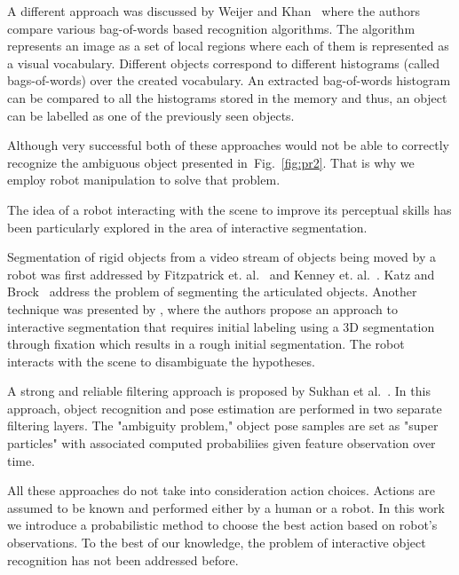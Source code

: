\documentclass[conference]{IEEEtran}
\newcommand{\figref}[1]{Fig.~\ref{#1}}
\begin{document}
    A different approach was discussed by Weijer and Khan~\cite{van2013fusing} where the authors compare various bag-of-words based recognition algorithms. The algorithm represents an image as a set of local regions where each of them is represented as a visual vocabulary. Different objects correspond to different histograms (called bags-of-words) over the created vocabulary. An extracted bag-of-words histogram can be compared to all the histograms stored in the memory and thus, an object can be labelled as one of the previously seen objects.

    Although very successful both of these approaches would not be able to correctly recognize the ambiguous object presented in~\figref{fig:pr2}. That is why we employ robot manipulation to solve that problem.

    The idea of a robot interacting with the scene to improve its perceptual skills has been particularly explored in the area of interactive segmentation.

    Segmentation of rigid objects from a video stream of objects being moved by a robot was first addressed by Fitzpatrick et. al.~\cite{fitzpatrick_active_vision} and Kenney et. al.~\cite{KenneyInteractive}. Katz and Brock~\cite{Katz-WS-MM-ICRA2011} address the problem of segmenting the articulated objects. Another technique was presented by \cite{bergstrom11icvs}, where the authors propose an approach to interactive segmentation that requires initial labeling using  a 3D segmentation through fixation which results in a rough initial segmentation. The robot interacts with the scene to disambiguate the hypotheses.

    
    A strong and reliable filtering approach is proposed by Sukhan et al.~\cite{sukhan2011Dependable3DobjectRecognitionWithTwoLayeredParticleFilter}. In this approach, object recognition and pose estimation are performed in two separate filtering layers. The "ambiguity problem," object pose samples are set as "super particles" with associated computed probabiliies given feature observation over time.  

    All these approaches do not take into consideration action choices. Actions are assumed to be known and performed either by a human or a robot. In this work we introduce a probabilistic method to choose the best action based on robot's observations. To the best of our knowledge, the problem of interactive object recognition has not been addressed before. 
\end{document}
